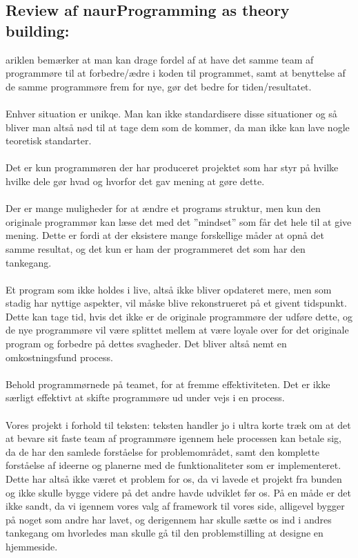 \documentclass[12pt,a4paper]{article}
\begin{document}
\subsection{Review af naurProgramming as theory building:}


ariklen bemærker at man kan drage fordel af at have det samme team af programmøre til at forbedre/ædre i koden til programmet, samt at benyttelse af de samme programmøre frem for nye, gør det bedre for tiden/resultatet.
\\ \bigskip \\
Enhver situation er unikqe. Man kan ikke standardisere disse situationer og så bliver man altså nød til at  tage dem som de kommer, da man ikke kan lave nogle teoretisk standarter.
\\ \bigskip \\
Det er kun programmøren der har produceret projektet som har styr på hvilke hvilke dele gør hvad og hvorfor det gav mening at gøre dette.
\\ \bigskip \\
Der er mange muligheder for at ændre et programs struktur, men kun den originale programmør kan læse det med det ”mindset” som får det hele til at give mening. Dette er fordi at der eksistere mange forskellige måder at opnå det samme resultat, og det kun er ham der programmeret det som har den tankegang.
\\ \bigskip \\
Et program som ikke holdes i live, altså ikke bliver opdateret mere, men som stadig har nyttige aspekter, vil måske blive rekonstrueret på et givent tidspunkt. Dette kan tage tid, hvis det ikke er de originale programmøre der udføre dette, og de nye programmøre vil være splittet mellem at være loyale over for det originale program og forbedre på dettes svagheder. Det bliver altså nemt en omkostningsfund process.
\\ \bigskip \\
Behold programmørnede på teamet, for at fremme effektiviteten. Det er ikke særligt effektivt at skifte programmøre ud under vejs i en process. \\ \bigskip \\


Vores projekt i forhold til teksten:
teksten handler jo i ultra korte træk om at det at bevare sit faste team af programmøre igennem hele processen kan betale sig, da de har den samlede forståelse for problemområdet, samt den komplette forståelse af ideerne og planerne med de funktionaliteter som er implementeret.
Dette har altså ikke været et problem for os, da vi lavede et projekt fra bunden og ikke skulle bygge videre på det andre havde udviklet før os. På en måde er det ikke sandt, da vi igennem vores valg af framework til vores side, alligevel bygger på noget som andre har lavet, og derigennem har skulle sætte os ind i andres tankegang om hvorledes man skulle gå til den problemstilling at designe en hjemmeside.
\end{document}

